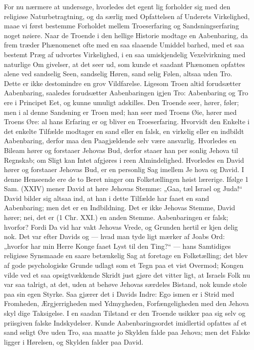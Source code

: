 \documentclass[12pt]{book}
\newcommand{\opage}[1]{\marginnote{\footnotesize\textit{[#1]}}}
\begin{document}
For nu nærmere at undersøge, hvorledes det egent\-%
lig forholder sig med den religiøse Naturbetragtning,
og da særlig med Opfattelsen af Underets Virkelighed,
maae vi først bestemme Forholdet mellem Troeserfaring
og Sandsningserfaring noget nøiere. Naar de Troende
i den hellige Historie modtage en Aabenbaring, da frem\-%
træder Phænomenet ofte med en saa slaaende Umiddel\-%
barhed, med et saa bestemt Præg af udvortes Virkelighed,
i en saa umiskjendelig Vexelvirkning med naturlige Om\-%
givelser, at det seer ud, som kunde et saadant Phænomen
opfattes alene ved sandselig Seen, sandselig Høren, sand\-%
selig Følen, altsaa uden Tro. Dette er ikke destomindre
en grov Vildfarelse. Ligesom Troen altid forudsætter
Aabenbaring, saaledes forudsætter Aabenbaringen igjen
Tro: Aabenbaring og Tro ere i Principet Eet, og kunne
umuligt adskilles. Den Troende seer, hører, føler; men
i al denne Sandsning er Troen med; han seer med
Troens Øie, hører med Troens Øre: al hans Erfaring
er og bliver en Troeserfaring. Hvorvidt den Enkelte i
det enkelte Tilfælde modtager en sand eller en falsk, en
virkelig eller en indbildt Aabenbaring, derfor maa den
Paagjældende selv være ansvarlig. Hvorledes en Bileam
hører og forstaaer Jehovas Bud, derfor staaer han per\-%
sonlig Jehova til Regnskab; om Sligt kan Intet afgjøres
i reen Almindelighed. Hvorledes en David hører og
forstaaer Jehovas Bud, er en personlig Sag imellem Je\-%
hova og David. I denne Henseende ere de to Beret\-%
ninger om Folketællingen høist lærerige. Ifølge 1 Sam.
(XXIV) mener David at høre Jehovas Stemme: „Gaa,
tæl Israel og Juda!“ David bilder sig altsaa ind, at
han i dette Tilfælde har faaet en sand Aabenbaring;
men det er en Indbildning. Det er ikke Jehovas Stemme,
\opage{171}\setcounter{footnote}{0}%
David hører; nei, det er (1 Chr. XXI.) en anden
Stemme. Aabenbaringen er falsk; hvorfor? Fordi Da\-%
vid har vakt Jehovas Vrede, og Grunden hertil er kjen\-%
delig nok. Det var efter Davids og --- hvad man tyde\-%
ligt mærker af Joabs Ord: „hvorfor har min Herre
Konge faaet Lyst til den Ting?“ --- hans Samtidiges
religiøse Synsmaade en saare betænkelig Sag at foretage
en Folketælling; det blev af gode psychologiske Grunde
udlagt som et Tegn paa et vist Overmod; Kongen vilde
ved et saa opsigtvækkende Skridt just gjøre det vitter\-%
ligt, at Israels Folk nu var saa talrigt, at det, uden at
behøve Jehovas særdeles Bistand, nok kunde stole paa
sin egen Styrke. Saa gjærer det i Davids Indre: Ego\-%
ismen er i Strid med Fromheden, Ærgjerrigheden med
Ydmygheden, Forfængeligheden med den Jehova skyl\-%
dige Taksigelse. I en saadan Tilstand er den Troende
usikker paa sig selv og priisgiven falske Indskydelser.
Kunde Aabenbaringsordet imidlertid opfattes af et sand\-%
seligt Øre uden Tro, saa maatte jo Skylden falde paa
Jehova; men det Falske ligger i Hørelsen, og Skylden
falder paa David.
\end{document}
